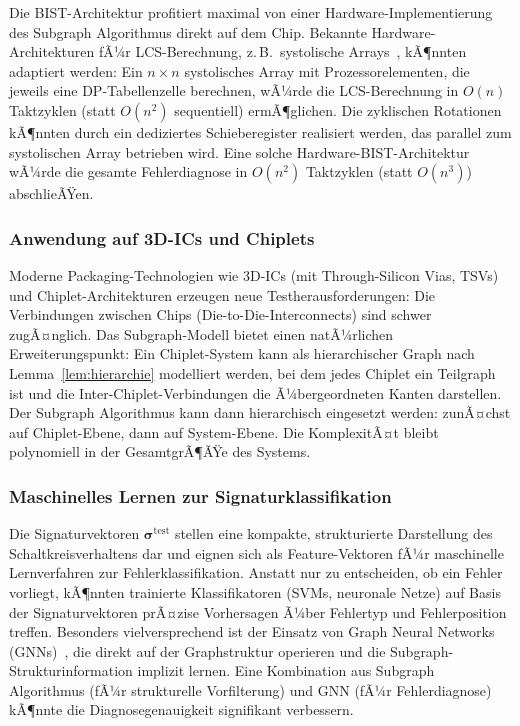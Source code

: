 ﻿\documentclass[a4paper,12pt]{article}
\theoremstyle{definition}
\begin{document}
Die BIST-Architektur profitiert maximal von einer
Hardware-Implementierung des Subgraph Algorithmus direkt auf dem
Chip. Bekannte Hardware-Architekturen fÃ¼r LCS-Berechnung, z.\,B.\
systolische Arrays~\cite{kung1979systolic}, kÃ¶nnten adaptiert werden:
Ein $n \times n$ systolisches Array mit Prozessorelementen, die
jeweils eine DP-Tabellenzelle berechnen, wÃ¼rde die LCS-Berechnung
in $O(n)$ Taktzyklen (statt $O(n^2)$ sequentiell) ermÃ¶glichen.
Die zyklischen Rotationen kÃ¶nnten durch ein dediziertes Schieberegister
realisiert werden, das parallel zum systolischen Array betrieben wird.
Eine solche Hardware-BIST-Architektur wÃ¼rde die gesamte Fehlerdiagnose
in $O(n^2)$ Taktzyklen (statt $O(n^3)$) abschlieÃŸen.

\subsubsection{Anwendung auf 3D-ICs und Chiplets}

Moderne Packaging-Technologien wie 3D-ICs (mit Through-Silicon Vias,
TSVs) und Chiplet-Architekturen erzeugen neue Testherausforderungen:
Die Verbindungen zwischen Chips (Die-to-Die-Interconnects) sind
schwer zugÃ¤nglich. Das Subgraph-Modell bietet einen natÃ¼rlichen
Erweiterungspunkt: Ein Chiplet-System kann als hierarchischer Graph
nach Lemma~\ref{lem:hierarchie} modelliert werden, bei dem jedes
Chiplet ein Teilgraph ist und die Inter-Chiplet-Verbindungen die
Ã¼bergeordneten Kanten darstellen. Der Subgraph Algorithmus kann dann
hierarchisch eingesetzt werden: zunÃ¤chst auf Chiplet-Ebene, dann
auf System-Ebene. Die KomplexitÃ¤t bleibt polynomiell in der
GesamtgrÃ¶ÃŸe des Systems.

\subsubsection{Maschinelles Lernen zur Signaturklassifikation}

Die Signaturvektoren $\boldsymbol{\sigma}^{\mathrm{test}}$ stellen
eine kompakte, strukturierte Darstellung des Schaltkreisverhaltens
dar und eignen sich als Feature-Vektoren fÃ¼r maschinelle
Lernverfahren zur Fehlerklassifikation. Anstatt nur zu entscheiden,
ob ein Fehler vorliegt, kÃ¶nnten trainierte Klassifikatoren (SVMs,
neuronale Netze) auf Basis der Signaturvektoren prÃ¤zise Vorhersagen
Ã¼ber Fehlertyp und Fehlerposition treffen. Besonders vielversprechend
ist der Einsatz von Graph Neural
Networks (GNNs)~\cite{kipf2017semi}, die direkt auf der Graphstruktur
operieren und die Subgraph-Strukturinformation implizit lernen.
Eine Kombination aus Subgraph Algorithmus (fÃ¼r strukturelle
Vorfilterung) und GNN (fÃ¼r Fehlerdiagnose) kÃ¶nnte die
Diagnosegenauigkeit signifikant verbessern.
\end{document}

